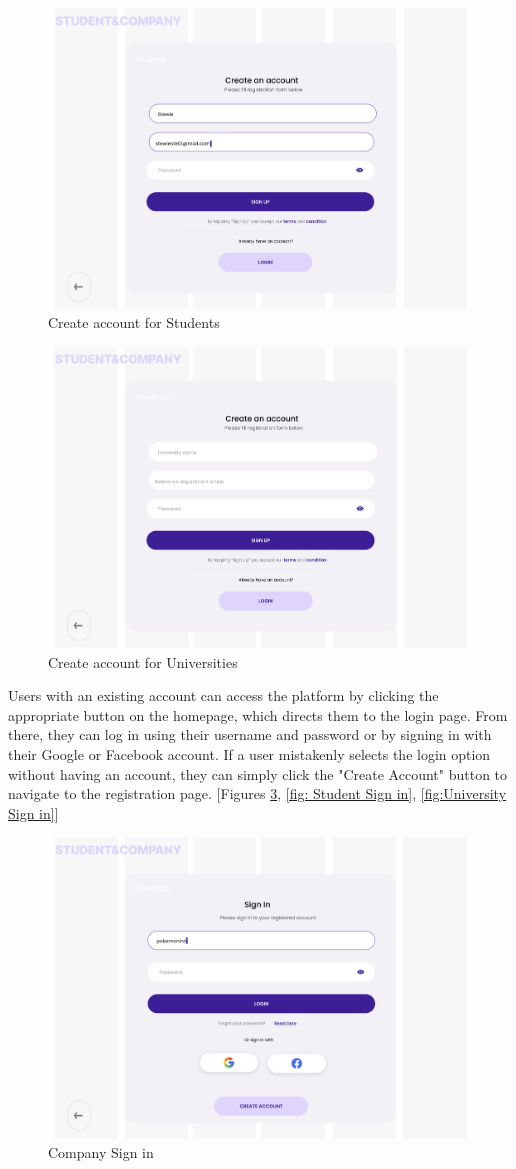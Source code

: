 \begin{figure} [H]
    \centering
    \includegraphics[width=0.5\linewidth]{Images/Interface Images/log in sing up/Screenshot 2024-12-12 045029.png}
    \caption{Create account for Students}
    \label{fig:Create account for Students}
\end{figure}

\begin{figure} [H]
    \centering
    \includegraphics[width=0.5\linewidth]{Images/Interface Images/log in sing up/Screenshot 2024-12-12 045042.png}
    \caption{Create account for Universities}
    \label{fig:Create account for Universities}
\end{figure}

Users with an existing account can access the platform by clicking the appropriate button on the homepage, which directs them to the login page. From there, they can log in using their username and password or by signing in with their Google or Facebook account. If a user mistakenly selects the login option without having an account, they can simply click the "Create Account" button to navigate to the registration page. [Figures \ref{fig:Company Sign in}, \ref{fig: Student Sign in}, \ref{fig:University Sign in}]

\begin{figure} [H]
    \centering
    \includegraphics[width=0.5\linewidth]{Images/Interface Images/log in sing up/Screenshot 2024-12-12 045111.png}
    \caption{Company Sign in}
    \label{fig:Company Sign in}
\end{figure}

